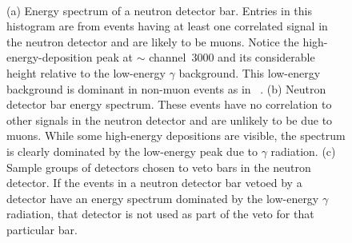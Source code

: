 \begin{figure}[!htbp]
\centering
{}
\hspace{8pt}
 \\
\caption[Determining appropriate groups of detectors for vetoing by examining the vetoed energy spectrum.]{(a) Energy spectrum of a neutron detector bar.  Entries in this histogram are from events having at least one correlated signal in the neutron detector and are likely to be muons.  Notice the high-energy-deposition peak at $\sim$ channel~3000 and its considerable height relative to the low-energy $\gamma$ background.  This low-energy background is dominant in non-muon events as in {\fig}~.  (b) Neutron detector bar energy spectrum.  These events have no correlation to other signals in the neutron detector and are unlikely to be due to muons.  While some high-energy depositions are visible, the spectrum is clearly dominated by the low-energy peak due to $\gamma$ radiation.  (c) Sample groups of detectors chosen to veto bars in the neutron detector.  If the events in a neutron detector bar vetoed by a detector have an energy spectrum dominated by the low-energy $\gamma$ radiation, that detector is not used as part of the veto for that particular bar.}
\label{fig:determineVetoGroups}
\end{figure}

